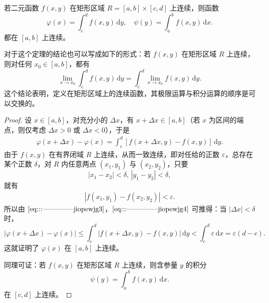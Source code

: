 \documentclass[../../main.tex]{subfiles}%
\begin{document}
\begin{theorem}[连续性]\label{theorem:含参量积分的连续性}
若二元函数 \( f(x,y) \) 在矩形区域 \( R = [a,b] \times [c,d] \) 上连续，则函数
\[
\varphi(x) = \int_{c}^{d} f(x,y) \, \mathrm{d}y,\quad \psi(y) = \int_{a}^{b} f(x,y) \, \mathrm{d}x .
\]
都在 \( [a,b] \) 上连续。
\end{theorem}
\begin{remark}
对于这个定理的结论也可以写成如下的形式：若 \( f(x,y) \) 在矩形区域 \( R \) 上连续，则对任何 \( x_0 \in [a,b] \)，都有
\[
\lim_{x \to x_0} \int_{c}^{d} f(x,y) \, \mathrm{d}y = \int_{c}^{d} \lim_{x \to x_0} f(x,y) \, \mathrm{d}y.
\]
这个结论表明，定义在矩形区域上的连续函数，其极限运算与积分运算的顺序是可以交换的。
\end{remark}
\begin{proof}
设 \( x \in [a,b] \)，对充分小的 \( \Delta x \)，有 \( x + \Delta x \in [a,b] \)（若 \( x \) 为区间的端点，则仅考虑 \( \Delta x > 0 \) 或 \( \Delta x < 0 \)），于是
\begin{align}
\varphi(x + \Delta x) - \varphi(x) = \int_{c}^{d} [f(x + \Delta x,y) - f(x,y)] \, \mathrm{d}y. \label{eq:::--------------jiopewjg3}
\end{align}
由于 \( f(x,y) \) 在有界闭域 \( R \) 上连续，从而一致连续，即对任给的正数 \( \varepsilon \)，总存在某个正数 \( \delta \)，对 \( R \) 内任意两点 \( (x_1,y_1) \) 与 \( (x_2,y_2) \)，只要
\[
|x_1 - x_2| < \delta, \, |y_1 - y_2| < \delta,
\]
就有
\begin{align}
|f(x_1,y_1) - f(x_2,y_2)| < \varepsilon.\label{eq:::--------------jiopewjg4}
\end{align}
所以由 \(\eqref{eq:::--------------jiopewjg3}\)，\(\eqref{eq:::--------------jiopewjg4}\) 可推得：当 \( |\Delta x| < \delta \) 时，
\[
|\varphi(x + \Delta x) - \varphi(x)| \leqslant \int_{c}^{d} |f(x + \Delta x,y) - f(x,y)| \, \mathrm{d}y
< \int_{c}^{d} \varepsilon \, \mathrm{d}x = \varepsilon(d - c).
\]
这就证明了 \( \varphi(x) \) 在 \( [a,b] \) 上连续。

同理可证：若 \( f(x,y) \) 在矩形区域 \( R \) 上连续，则含参量 \( y \) 的积分
\[
\psi(y) = \int_{a}^{b} f(x,y) \, \mathrm{d}x .
\]
在 \( [c,d] \) 上连续。
\end{proof}
\end{document}
